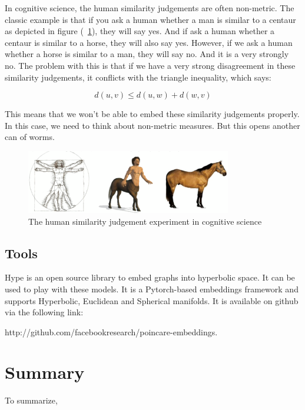 In cognitive science, the human similarity judgements are often non-metric. The classic example is that if you ask a human whether a man is similar to a centaur as depicted in figure (~\ref{fig:3-cog}), they will say yes. And if ask a human whether a centaur is similar to a horse, they will also say yes. However, if we ask a human whether a horse is similar to a man, they will say no. And it is a very strongly no. The problem with this is that if we have a very strong disagreement in these similarity judgements, it conflicts with the triangle inequality, which says: 

\begin{equation} \label{eq:triangleIne}
    d(u,v) \leq d(u, w) + d(w, v)
\end{equation}

This means that we won't be able to embed these similarity judgements properly. In this case, we need to think about non-metric measures. But this opens another can of worms.

\begin{figure}[htb]
  \centering
    \includegraphics[width=0.8\textwidth]{lectures/11-b/Images/3-cog.png}
    \caption{The human similarity judgement experiment in cognitive science}
    \label{fig:3-cog}
\end{figure}

\subsection{Tools}

Hype is an open source library to embed graphs into hyperbolic space. It can be used to play with these models. It is a Pytorch-based embeddings framework and supports Hyperbolic, Euclidean and Spherical manifolds. It is available on github via the following link:

http://github.com/facebookresearch/poincare-embeddings.


\section{Summary}

To summarize, 

